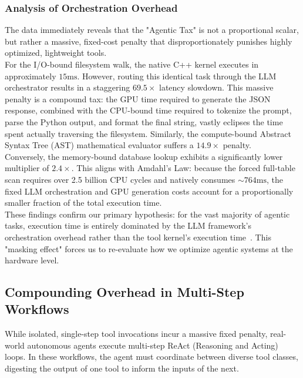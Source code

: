 \documentclass[10pt, letterpaper]{article}
\begin{document}
\subsubsection*{Analysis of Orchestration Overhead}
The data immediately reveals that the "Agentic Tax" is not a proportional scalar, but rather a massive, fixed-cost penalty that disproportionately punishes highly optimized, lightweight tools. \\

\noindent For the I/O-bound filesystem walk, the native C++ kernel executes in approximately $15\text{ms}$. However, routing this identical task through the LLM orchestrator results in a staggering $69.5\times$ latency slowdown. This massive penalty is a compound tax: the GPU time required to generate the JSON response, combined with the CPU-bound time required to tokenize the prompt, parse the Python output, and format the final string, vastly eclipses the time spent actually traversing the filesystem. Similarly, the compute-bound Abstract Syntax Tree (AST) mathematical evaluator suffers a $14.9\times$ penalty.\\

\noindent Conversely, the memory-bound database lookup exhibits a significantly lower multiplier of $2.4\times$. This aligns with Amdahl's Law: because the forced full-table scan requires over 2.5 billion CPU cycles and natively consumes $\sim 764\text{ms}$, the fixed LLM orchestration and GPU generation costs account for a proportionally smaller fraction of the total execution time.\\

\noindent These findings confirm our primary hypothesis: for the vast majority of agentic tasks, execution time is entirely dominated by the LLM framework's orchestration overhead rather than the tool kernel's execution time~\cite{sutradhara, data_systems, cpu_centric}. This "masking effect" forces us to re-evaluate how we optimize agentic systems at the hardware level.

\subsection{Compounding Overhead in Multi-Step Workflows}

While isolated, single-step tool invocations incur a massive fixed penalty, real-world autonomous agents execute multi-step ReAct (Reasoning and Acting) loops. In these workflows, the agent must coordinate between diverse tool classes, digesting the output of one tool to inform the inputs of the next. \\
\end{document}
